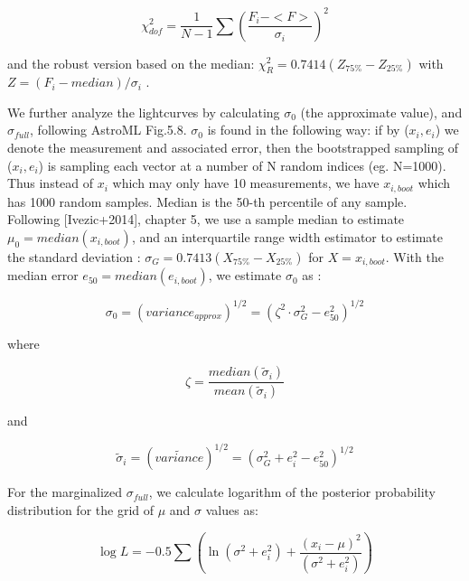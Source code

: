 \documentclass[fleqn,usenatbib]{mnras}  %
\begin{document}
\begin{equation}
\chi^{2}_{dof} = \frac{1}{N-1}\sum{\left( \frac{F_{i} - <F>} {\sigma_{i}} \right) ^{2}}
\end{equation}

and the robust version based on the median: $\chi^{2}_{R} = 0.7414 (Z_{75\%} - Z_{25\%} )$ with  $Z=(F_{i} - median) / \sigma_{i}$ . 

We further analyze the lightcurves by calculating $\sigma_{0}$ (the approximate value), and $\sigma_{full}$, following AstroML Fig.5.8. 
$\sigma_{0}$ is found in the following way: if by ($x_{i}, e_{i}$) we denote the measurement and associated error, then the bootstrapped sampling of ($x_{i}, e_{i}$) is sampling each vector at a number of N random indices (eg. N=1000). Thus instead of $x_{i}$ which may only have 10 measurements, we have $x_{i,boot}$ which has 1000 random samples. Median is the 50-th percentile of any sample.  Following [Ivezic+2014], chapter 5, we use a sample median to estimate $\mu_{0} = median(x_{i,boot})$, and an interquartile range width estimator to estimate the standard deviation : $\sigma_{G} =0.7413 (X_{75\%} - X_{25\%}) $ for $X = x_{i,boot}$.
With the median error $e_{50} = median(e_{i,boot})$, we estimate $\sigma_{0}$ as : 

\begin{equation}
\sigma_{0} = ( variance_{approx} )^{1/2} = (\zeta^{2} \cdot \sigma_{G}^{2} - e_{50} ^ {2})^{1/2}
\end{equation}

where 

\begin{equation}
\zeta = \frac{median(\widetilde{\sigma}_{i})} {mean(\widetilde{\sigma}_{i})}
\end{equation}

and 

\begin{equation}
\widetilde{\sigma}_{i} =  ( \widetilde{variance} )^{1/2} = ( \sigma_{G}^{2} + e_{i}^{2} - e_{50}^{2} )^{1/2}
\end{equation}


For the marginalized $\sigma_{full}$, we calculate logarithm of the posterior probability distribution for the grid of $\mu$ and $\sigma$ values as:

\begin{equation}
\log{L} = -0.5 \sum \left( \ln(\sigma^{2}+e_{i}^{2}) + \frac{(x_{i}-\mu)^{2}}{(\sigma^{2}+e_{i}^{2})} \right)
\end{equation}
\end{document}
